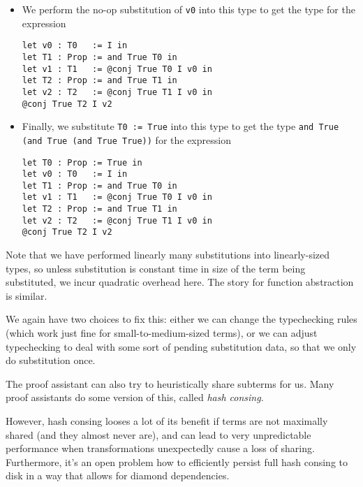 \begin{itemize}
\begin{verbatim}
\end{verbatim}
  \item
  We perform the no-op substitution of \texttt{v0} into this type to get the type for the expression
\begin{verbatim}
let v0 : T0   := I in
let T1 : Prop := and True T0 in
let v1 : T1   := @conj True T0 I v0 in
let T2 : Prop := and True T1 in
let v2 : T2   := @conj True T1 I v0 in
@conj True T2 I v2
\end{verbatim}
  \item
  Finally, we substitute \texttt{T0 := True} into this type to get the type \texttt{and True (and True (and True True))} for the expression
\begin{verbatim}
let T0 : Prop := True in
let v0 : T0   := I in
let T1 : Prop := and True T0 in
let v1 : T1   := @conj True T0 I v0 in
let T2 : Prop := and True T1 in
let v2 : T2   := @conj True T1 I v0 in
@conj True T2 I v2
\end{verbatim}
\end{itemize}
Note that we have performed linearly many substitutions into linearly-sized types, so unless substitution is constant time in size of the term being substituted, we incur quadratic overhead here.
The story for function abstraction is similar.


We again have two choices to fix this:
either we can change the typechecking rules (which work just fine for small-to-medium-sized terms), or we can adjust typechecking to deal with some sort of pending substitution data, so that we only do substitution once.




The proof assistant can also try to heuristically share subterms for us.
Many proof assistants do some version of this, called \emph{hash consing}.

However, hash consing looses a lot of its benefit if terms are not maximally shared (and they almost never are), and can lead to very unpredictable performance when transformations unexpectedly cause a loss of sharing.
Furthermore, it's an open problem how to efficiently persist full hash consing to disk in a way that allows for diamond dependencies.

